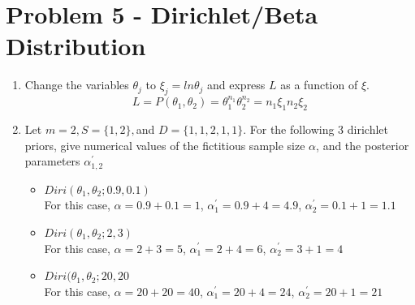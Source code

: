 \documentclass[preprint,12pt]{elsarticle}
\begin{document}
	\section{Problem 5 - Dirichlet/Beta Distribution}
	\begin{enumerate}[label=\alph*]
		\item Change the variables $\theta_j$ to $\xi_j=ln \theta_j$ and express
		$L$ as a function of $\xi$.
		\begin{equation*}
			L = P(\theta_1,\theta_2) = \theta_1^{n_1}\theta_2^{n_2} = n_1\xi_1 n_2\xi_2
		\end{equation*}

		\item Let $m=2,S=\{1,2\}, $and $D=\{1,1,2,1,1\}$. For the following 3 dirichlet priors, give numerical values of the fictitious sample size $\alpha$, and the posterior parameters $\alpha_{1,2}^{'}$

		\begin{itemize}
			\item $Diri(\theta_1,\theta_2;0.9,0.1)$
			\\ For this case, $\alpha=0.9+0.1=1$, $\alpha_1^{'}=0.9+4=4.9$,
			$\alpha_2^{'}=0.1+1=1.1$

			\item $Diri(\theta_1,\theta_2;2,3)$
			\\ For this case, $\alpha=2+3=5$, $\alpha_1^{'}=2+4=6$,
			$\alpha_2^{'}=3+1=4$

			\item $Diri(\theta_1,\theta_2;20,20$
			\\ For this case, $\alpha=20+20=40$, $\alpha_1^{'}=20+4=24$,
			$\alpha_2^{'}=20+1=21$
		\end{itemize}


\end{enumerate}
\end{document}
